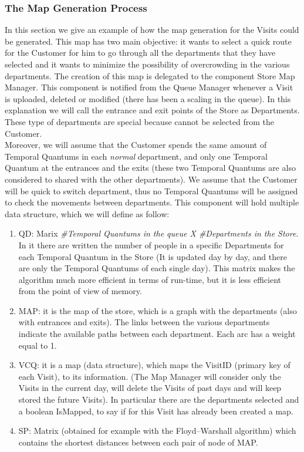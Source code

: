 \documentclass[a4paper, 12pt, oneside, table]{article}
\begin{document}
\subsubsection{The Map Generation Process}
In this section we give an example of how the map generation for the Visits could be generated. This map has two main objective: it wants to select a quick route for the Customer for him to go through all the departments that they have selected and it wants to minimize the possibility of overcrowding in the various departments. The creation of this map is delegated to the component Store Map Manager. This component is notified from the Queue Manager whenever a Visit is uploaded, deleted or modified (there has been a scaling in the queue). In this explanation we will call the entrance and exit points of the Store as Departments. These type of departments are special because cannot be selected from the Customer.\newline 
\\
Moreover, we will assume that the Customer spends the same amount of Temporal Quantums in each \textit{normal} department, and only one Temporal Quantum at the entrances and the exits (these two Temporal Quantums are also considered to shared with the other departments). We assume that the Customer will be quick to switch department, thus no Temporal Quantums will be assigned to check the movements between departments. This component will hold multiple data structure, which we will define as follow:
\begin{enumerate}
    \item QD: Marix \textit{\#Temporal Quantums in the queue X \#Departments in the Store}. In it there are written the number of people in a specific Departments for each Temporal Quantum in the Store (It is updated day by day, and there are only the Temporal Quantums of each single day). This matrix makes the algorithm much more efficient in terms of run-time, but it is less efficient from the point of view of memory.
    \item MAP: it is the map of the store, which is a graph with the departments (also with entrances and exits). The links between the various departments indicate the available paths between each department. Each arc has a weight equal to 1.
    \item VCQ: it is a map (data structure), which maps the VisitID (primary key of each Visit), to its information. (The Map Manager will consider only the Visits in the current day, will delete the Visits of past days and will keep stored the future Visits). In particular there are the departments selected and a boolean IsMapped, to say if for this Visit has already been created a map.
    \item SP: Matrix (obtained for example with the Floyd–Warshall algorithm) which contains the shortest distances between each pair of node of MAP.
\end{enumerate}
\end{document}

